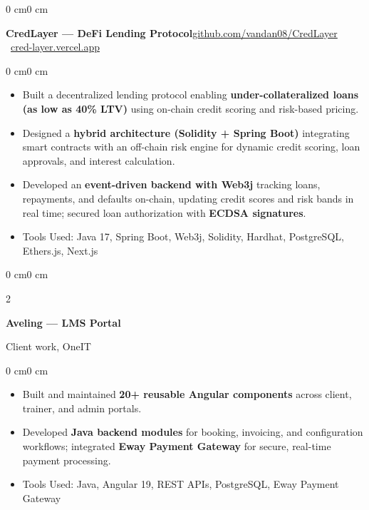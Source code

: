 \documentclass[10pt, letterpaper]{article}
\newenvironment{highlights}{
    \begin{itemize}[
        topsep=0.08 cm,
        parsep=0.08 cm,
        partopsep=0pt,
        itemsep=0pt,
        leftmargin=0.4 cm
    ]
}{
    \end{itemize}
}
\newenvironment{onecolentry}{
    \begin{adjustwidth}{0 cm}{0 cm}
}{
    \end{adjustwidth}
}
\newenvironment{twocolentry}[2][]{
    \onecolentry
    \def\secondColumn{#2}
    \setcolumnwidth{\fill, 4.5 cm}
    \begin{paracol}{2}
}{
    \switchcolumn \raggedleft \secondColumn
    \end{paracol}
    \endonecolentry
}
\let\hrefWithoutArrow\href
\begin{document}
    \vspace{0.2 cm}

    \begin{onecolentry}
        \textbf{CredLayer --- DeFi Lending Protocol}\hfill{\small\hrefWithoutArrow{https://github.com/vandan08/CredLayer}{github.com/vandan08/CredLayer} \textbar\ \hrefWithoutArrow{https://cred-layer.vercel.app/dashboard}{cred-layer.vercel.app}}
    \end{onecolentry}

    \vspace{0.05 cm}
    \begin{onecolentry}
        \begin{highlights}
            \item Built a decentralized lending protocol enabling \textbf{under-collateralized loans (as low as 40\% LTV)} using on-chain credit scoring and risk-based pricing.
            \item Designed a \textbf{hybrid architecture (Solidity + Spring Boot)} integrating smart contracts with an off-chain risk engine for dynamic credit scoring, loan approvals, and interest calculation.
            \item Developed an \textbf{event-driven backend with Web3j} tracking loans, repayments, and defaults on-chain, updating credit scores and risk bands in real time; secured loan authorization with \textbf{ECDSA signatures}.
            \item Tools Used: Java 17, Spring Boot, Web3j, Solidity, Hardhat, PostgreSQL, Ethers.js, Next.js
        \end{highlights}
    \end{onecolentry}

    \vspace{0.2 cm}

    \begin{twocolentry}{Client work, OneIT}
        \textbf{Aveling --- LMS Portal}
    \end{twocolentry}

    \vspace{0.05 cm}
    \begin{onecolentry}
        \begin{highlights}
            \item Built and maintained \textbf{20+ reusable Angular components} across client, trainer, and admin portals.
            \item Developed \textbf{Java backend modules} for booking, invoicing, and configuration workflows; integrated \textbf{Eway Payment Gateway} for secure, real-time payment processing.
            \item Tools Used: Java, Angular 19, REST APIs, PostgreSQL, Eway Payment Gateway
        \end{highlights}
    \end{onecolentry}
\end{document}
